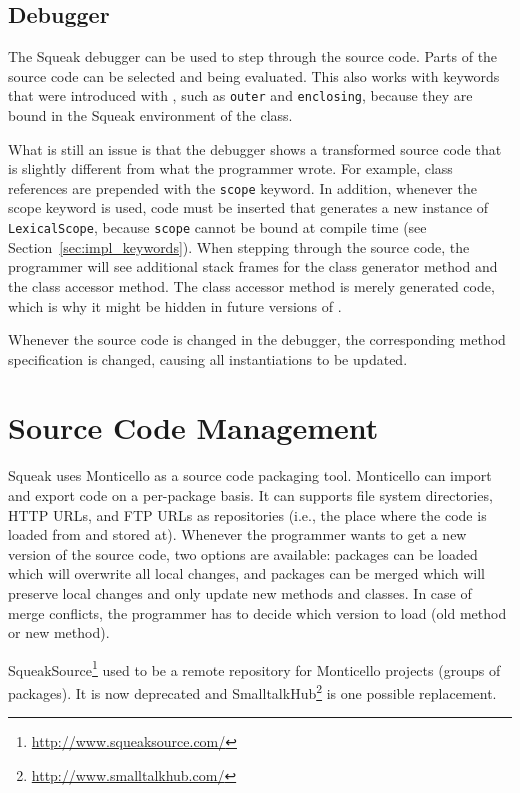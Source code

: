 \subsection{Debugger}
The Squeak debugger can be used to step through the source code. Parts of the source code can be selected and being evaluated. This also works with keywords that were introduced with \msname, such as \texttt{outer} and \texttt{enclosing}, because they are bound in the Squeak environment of the class.

What is still an issue is that the debugger shows a transformed source code that is slightly different from what the programmer wrote. For example, class references are prepended with the \texttt{scope} keyword. In addition, whenever the scope keyword is used, code must be inserted that generates a new instance of \texttt{LexicalScope}, because \texttt{scope} cannot be bound at compile time (see Section~\ref{sec:impl_keywords}). When stepping through the source code, the programmer will see additional stack frames for the class generator method and the class accessor method. The class accessor method is merely generated code, which is why it might be hidden in future versions of \msname.

Whenever the source code is changed in the debugger, the corresponding method specification is changed, causing all instantiations to be updated.

\section{Source Code Management}
\label{sec:impl_scm_chap}
Squeak uses Monticello as a source code packaging tool. Monticello can import and export code on a per-package basis. It can supports file system directories, HTTP URLs, and FTP URLs as repositories (i.e., the place where the code is loaded from and stored at). Whenever the programmer wants to get a new version of the source code, two options are available: packages can be loaded which will overwrite all local changes, and packages can be merged which will preserve local changes and only update new methods and classes. In case of merge conflicts, the programmer has to decide which version to load (old method or new method).

SqueakSource\footnote{\url{http://www.squeaksource.com/}} used to be a remote repository for Monticello projects (groups of packages). It is now deprecated and SmalltalkHub\footnote{\url{http://www.smalltalkhub.com/}} is one possible replacement.

